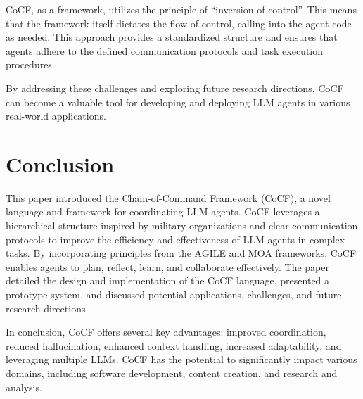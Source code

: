 CoCF, as a framework, utilizes the principle of ``inversion of control''. This means
that the framework itself dictates the flow of control, calling into the agent
code as needed. This approach provides a standardized structure and ensures that
agents adhere to the defined communication protocols and task execution procedures.

By addressing these challenges and exploring future research directions, CoCF
can become a valuable tool for developing and deploying LLM agents in various
real-world applications.

\section{Conclusion}
\label{sec:conclusion}

This paper introduced the Chain-of-Command Framework (CoCF), a novel language
and framework for coordinating LLM agents. CoCF leverages a hierarchical structure
inspired by military organizations and clear communication protocols to improve the
efficiency and effectiveness of LLM agents in complex tasks. By incorporating
principles from the AGILE and MOA frameworks, CoCF enables agents to plan,
reflect, learn, and collaborate effectively. The paper detailed the design and implementation
of the CoCF language, presented a prototype system, and discussed potential applications,
challenges, and future research directions.

In conclusion, CoCF offers several key advantages: improved coordination,
reduced hallucination, enhanced context handling, increased adaptability, and leveraging
multiple LLMs. CoCF has the potential to significantly impact various domains, including
software development, content creation, and research and analysis.